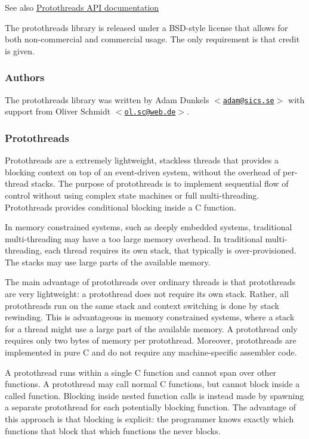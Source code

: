 \begin{DoxySeeAlso}{\-See also}
\hyperlink{a00052}{\-Protothreads \-A\-P\-I documentation}
\end{DoxySeeAlso}
\-The protothreads library is released under a \-B\-S\-D-\/style license that allows for both non-\/commercial and commercial usage. \-The only requirement is that credit is given.\hypertarget{a00052_authors}{}\subsubsection{\-Authors}\label{a00052_authors}
\-The protothreads library was written by \-Adam \-Dunkels $<$\href{mailto:adam@sics.se}{\tt adam@sics.\-se}$>$ with support from \-Oliver \-Schmidt $<$\href{mailto:ol.sc@web.de}{\tt ol.\-sc@web.\-de}$>$.\hypertarget{a00052_pt-desc}{}\subsubsection{\-Protothreads}\label{a00052_pt-desc}
\-Protothreads are a extremely lightweight, stackless threads that provides a blocking context on top of an event-\/driven system, without the overhead of per-\/thread stacks. \-The purpose of protothreads is to implement sequential flow of control without using complex state machines or full multi-\/threading. \-Protothreads provides conditional blocking inside a \-C function.

\-In memory constrained systems, such as deeply embedded systems, traditional multi-\/threading may have a too large memory overhead. \-In traditional multi-\/threading, each thread requires its own stack, that typically is over-\/provisioned. \-The stacks may use large parts of the available memory.

\-The main advantage of protothreads over ordinary threads is that protothreads are very lightweight\-: a protothread does not require its own stack. \-Rather, all protothreads run on the same stack and context switching is done by stack rewinding. \-This is advantageous in memory constrained systems, where a stack for a thread might use a large part of the available memory. \-A protothread only requires only two bytes of memory per protothread. \-Moreover, protothreads are implemented in pure \-C and do not require any machine-\/specific assembler code.

\-A protothread runs within a single \-C function and cannot span over other functions. \-A protothread may call normal \-C functions, but cannot block inside a called function. \-Blocking inside nested function calls is instead made by spawning a separate protothread for each potentially blocking function. \-The advantage of this approach is that blocking is explicit\-: the programmer knows exactly which functions that block that which functions the never blocks.

